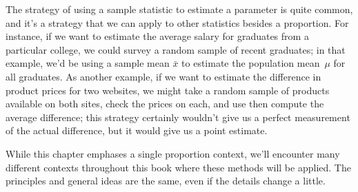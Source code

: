 The strategy of using a sample statistic to estimate
a parameter is quite common, and it's a strategy that
we can apply to other statistics besides a proportion.
For instance, if we want to estimate the average salary
for graduates from a particular college, we could
survey a random sample of recent graduates;
in that example, we'd be using a sample mean $\bar{x}$
to estimate the population mean~$\mu$ for all graduates.
As another example, if we want to estimate the
difference in product prices for two websites,
we might take a random sample of products available
on both sites, check the prices on each,
and use then compute the average difference;
this strategy certainly wouldn't give us a perfect
measurement of the actual difference, but it would
give us a point estimate.

While this chapter emphases a single proportion
context, we'll encounter many different contexts
throughout this book where these methods will be
applied.
The principles and general ideas are the same,
even if the details change a little.



\D{\newpage}

